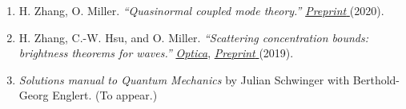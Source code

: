 \documentclass[11pt]{article}
\begin{document}
\begin{enumerate}[leftmargin=1.5em, itemsep=0.6em]
		
		\item H. Zhang, O. Miller. \textit{“Quasinormal coupled mode theory.”}  \href{https://arxiv.org/abs/2010.08650}{\color{blue} \emph{Preprint} }(2020).
		
		\item H. Zhang, C.-W. Hsu, and O. Miller. \textit{“Scattering concentration bounds: brightness theorems for waves.”} \href{https://opg.optica.org/optica/fulltext.cfm?uri=optica-6-10-1321}{\color{blue}  \emph{Optica}},    \href{https://arxiv.org/abs/1810.02727}{\color{blue} \emph{Preprint} }(2019).
		
		\item \textit{Solutions manual to Quantum Mechanics} by Julian Schwinger with Berthold-Georg Englert. (To appear.)
		
	\end{enumerate}
	
\end{document}
